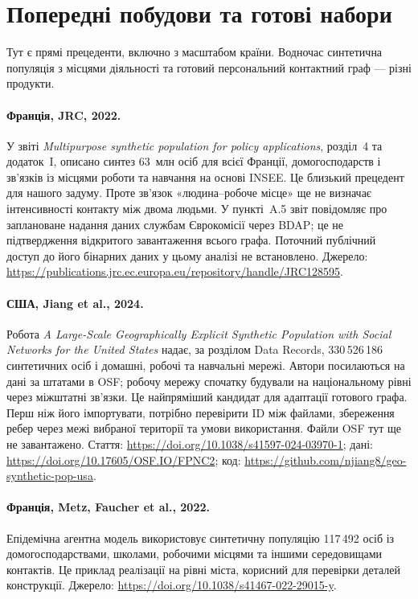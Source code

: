 \documentclass[11pt,a4paper]{article}
\begin{document}
\section{Попередні побудови та готові набори}
Тут є прямі прецеденти, включно з масштабом країни. Водночас синтетична популяція з місцями діяльності та готовий персональний контактний граф --- різні продукти.

\paragraph{Франція, JRC, 2022.} У звіті \emph{Multipurpose synthetic population for policy applications}, розділ~4 та додаток~I, описано синтез 63~млн осіб для всієї Франції, домогосподарств і зв'язків із місцями роботи та навчання на основі INSEE. Це близький прецедент для нашого задуму. Проте зв'язок «людина--робоче місце» ще не визначає інтенсивності контакту між двома людьми. У пункті~A.5 звіт повідомляє про заплановане надання даних службам Єврокомісії через BDAP; це не підтвердження відкритого завантаження всього графа. Поточний публічний доступ до його бінарних даних у цьому аналізі не встановлено. Джерело: \url{https://publications.jrc.ec.europa.eu/repository/handle/JRC128595}.

\paragraph{США, Jiang et al., 2024.} Робота \emph{A Large-Scale Geographically Explicit Synthetic Population with Social Networks for the United States} надає, за розділом Data Records, 330\,526\,186 синтетичних осіб і домашні, робочі та навчальні мережі. Автори посилаються на дані за штатами в OSF; робочу мережу спочатку будували на національному рівні через міжштатні зв'язки. Це найпряміший кандидат для адаптації готового графа. Перш ніж його імпортувати, потрібно перевірити ID між файлами, збереження ребер через межі вибраної території та умови використання. Файли OSF тут ще не завантажено. Стаття: \url{https://doi.org/10.1038/s41597-024-03970-1}; дані: \url{https://doi.org/10.17605/OSF.IO/FPNC2}; код: \url{https://github.com/njiang8/geo-synthetic-pop-usa}.

\paragraph{Франція, Metz, Faucher et al., 2022.} Епідемічна агентна модель використовує синтетичну популяцію 117\,492 осіб із домогосподарствами, школами, робочими місцями та іншими середовищами контактів. Це приклад реалізації на рівні міста, корисний для перевірки деталей конструкції. Джерело: \url{https://doi.org/10.1038/s41467-022-29015-y}.
\end{document}
